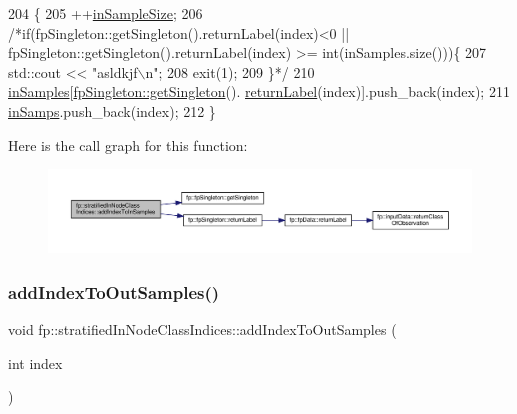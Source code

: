 \begin{DoxyCode}
204                                                       \{
205                 ++\hyperlink{classfp_1_1stratifiedInNodeClassIndices_a2acb617e3212806ae7f994d925bd1468}{inSampleSize};
206                 \textcolor{comment}{/*if(fpSingleton::getSingleton().returnLabel(index)<0 ||
       fpSingleton::getSingleton().returnLabel(index) >= int(inSamples.size()))\{}
207 \textcolor{comment}{                    std::cout << "asldkjf\(\backslash\)n";}
208 \textcolor{comment}{                    exit(1);}
209 \textcolor{comment}{                    \}*/}
210                 \hyperlink{classfp_1_1stratifiedInNodeClassIndices_a6bfa636c77b48163f5d245959ea753d0}{inSamples}[\hyperlink{classfp_1_1fpSingleton_a8bdae77b68521003e3fc630edec2e240}{fpSingleton::getSingleton}().
      \hyperlink{classfp_1_1fpSingleton_aa2f644b1521948fb994f4087ddfaea14}{returnLabel}(index)].push\_back(index);
211                 \hyperlink{classfp_1_1stratifiedInNodeClassIndices_ab6be4d82677c462494a4b4ef90c79bde}{inSamps}.push\_back(index);
212             \}
\end{DoxyCode}
Here is the call graph for this function\+:
\nopagebreak
\begin{figure}[H]
\begin{center}
\leavevmode
\includegraphics[width=350pt]{classfp_1_1stratifiedInNodeClassIndices_a493b23961e38f5f534c236a22b4ff4b6_cgraph}
\end{center}
\end{figure}
\mbox{\label{classfp_1_1stratifiedInNodeClassIndices_adc99a046031545bc59c2b43abcf75ed9}} 
\subsubsection{\texorpdfstring{add\+Index\+To\+Out\+Samples()}{addIndexToOutSamples()}}
{\footnotesize\ttfamily void fp\+::stratified\+In\+Node\+Class\+Indices\+::add\+Index\+To\+Out\+Samples (\begin{DoxyParamCaption}\item[{int}]{index }\end{DoxyParamCaption})\hspace{0.3cm}{\ttfamily [inline]}}



